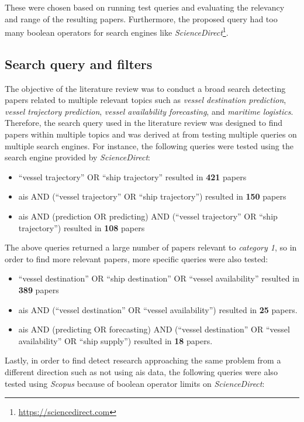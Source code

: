 These were chosen based on running test queries and evaluating the relevancy and range of the resulting papers. Furthermore, the proposed query had too many boolean operators for search engines like \textit{ScienceDirect}\footnote{\url{https://sciencedirect.com}}.

\subsection{Search query and filters}

The objective of the literature review was to conduct a broad search detecting papers related to multiple relevant topics such as \textit{vessel destination prediction}, \textit{vessel trajectory prediction}, \textit{vessel availability forecasting}, and \textit{maritime logistics}. Therefore, the search query used in the literature review was designed to find papers within multiple topics and was derived at from testing multiple queries on multiple search engines. For instance, the following queries were tested using the search engine provided by \textit{ScienceDirect}:

\begin{itemize}
    \item ``vessel trajectory'' OR ``ship trajectory'' resulted in \textbf{421} papers
    \item ais AND (``vessel trajectory'' OR ``ship trajectory'') resulted in \textbf{150} papers
    \item ais AND (prediction OR predicting) AND (``vessel trajectory'' OR ``ship trajectory'') resulted in \textbf{108} papers
\end{itemize}

The above queries returned a large number of papers relevant to \textit{category 1}, so in order to find more relevant papers, more specific queries were also tested:

\begin{itemize}
    \item ``vessel destination'' OR ``ship destination'' OR ``vessel availability'' resulted in \textbf{389} papers
    \item ais AND (``vessel destination'' OR ``vessel availability'') resulted in \textbf{25} papers.
    \item ais AND (predicting OR forecasting) AND (``vessel destination'' OR ``vessel availability'' OR ``ship supply'') resulted in \textbf{18} papers.
\end{itemize}

Lastly, in order to find detect research approaching the same problem from a different direction such as not using \acrshort{ais} data, the following queries were also tested using \textit{Scopus} because of boolean operator limits on \textit{ScienceDirect}:

